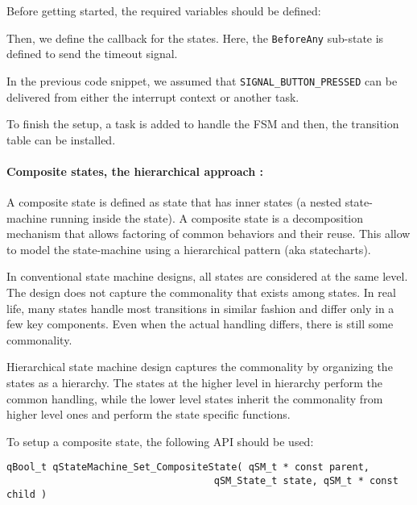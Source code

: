 Before getting started, the required variables should be defined: 
\medskip



Then, we define the callback for the states. Here, the \lstinline{BeforeAny} sub-state is defined to send the timeout signal. 
\medskip



In the previous code snippet, we assumed that \lstinline{SIGNAL_BUTTON_PRESSED} can be delivered from either the interrupt context or another task.

To finish the setup, a task is added to handle the FSM and then, the transition table can be installed.
\medskip



\paragraph{Composite states, the hierarchical approach : } A composite state is defined as state that has inner states (a nested state-machine running inside the state). A composite state is a decomposition mechanism that allows factoring of common behaviors and their reuse. This allow to model the state-machine using a hierarchical pattern (aka statecharts). 

In conventional state machine designs, all states are considered at the same level. The design does not capture the commonality that exists among states. In real life, many states handle most transitions in similar fashion and differ only in a few key components. Even when the actual handling differs, there is still some commonality.

Hierarchical state machine design captures the commonality by organizing the states as a hierarchy. The states at the higher level in hierarchy perform the common handling, while the lower level states inherit the commonality from higher level ones and perform the state specific functions. 

To setup a composite state, the following API should be used:
\medskip

\begin{lstlisting}[style=CStyle]
qBool_t qStateMachine_Set_CompositeState( qSM_t * const parent, 
                                    qSM_State_t state, qSM_t * const child )
\end{lstlisting}

